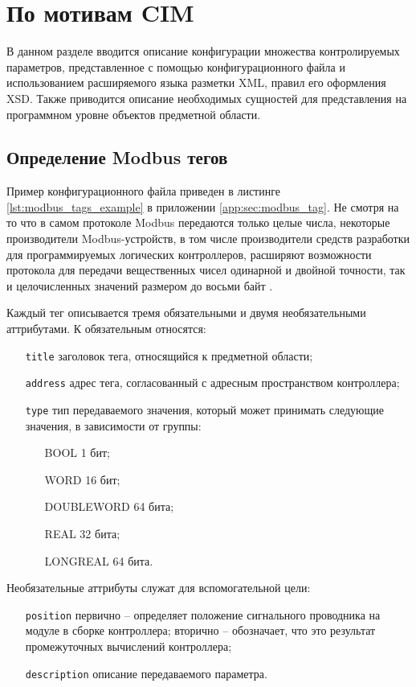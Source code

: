 \chapter{По мотивам CIM}

В данном разделе вводится описание конфигурации множества контролируемых параметров,
представленное с помощью конфигурационного файла и использованием расширяемого языка разметки XML, правил его оформления XSD.
Также приводится описание необходимых сущностей для представления
на программном уровне объектов предметной области.


\section{Определение Modbus тегов} \label{sec:modbus_tag}
Пример конфигурационного файла приведен в листинге \ref{lst:modbus_tags_example} в приложении \ref{app:sec:modbus_tag}.
Не смотря на то что в самом протоколе Modbus передаются только целые числа, некоторые производители Modbus-устройств,
в том числе производители средств разработки для программируемых логических контроллеров, расширяют возможности протокола
для передачи вещественных чисел одинарной и двойной точности, так и целочисленных значений размером до восьми байт \cite{book:gost:modbus_program_language}.

Каждый тег описывается тремя обязательными и двумя необязательными аттрибутами.
К обязательным относятся:
\begin{itemize}
    \item[\texttt{title}] заголовок тега, относящийся к предметной области;
    \item[\texttt{address}] адрес тега, согласованный с адресным пространством контроллера;
    \item[\texttt{type}] тип передаваемого значения, который может принимать следующие значения, в зависимости от группы:
    \begin{itemize}
        \item[BOOL] 1 бит;
        \item[WORD] 16 бит;
        \item[DOUBLEWORD] 64 бита;
        \item[REAL] 32 бита;
        \item[LONGREAL] 64 бита.
    \end{itemize}
\end{itemize}
Необязательные аттрибуты служат для вспомогательной цели:
\begin{itemize}
    \item[\texttt{position}] первично -- определяет положение сигнального проводника на модуле в сборке контроллера;
    вторично -- обозначает, что это результат промежуточных вычислений контроллера;
    \item[\texttt{description}] описание передаваемого параметра.
\end{itemize}



